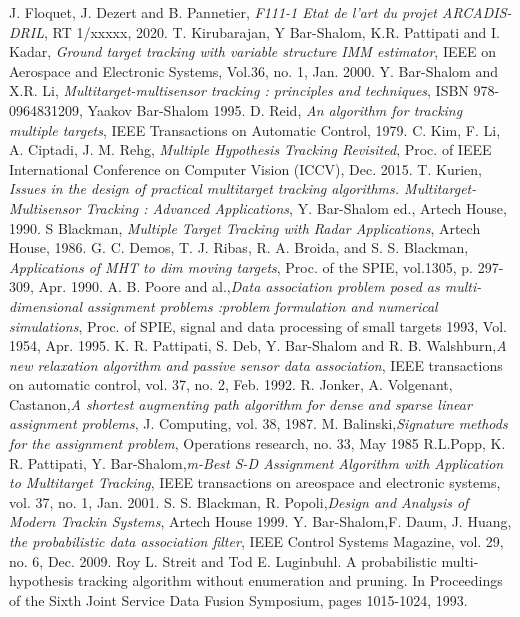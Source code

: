 \documentclass[10pt,french,a4paper]{report}
\begin{document}
 
 
  
 \begin{thebibliography}{9} 
 J. Floquet, J. Dezert and B. Pannetier, \emph{F111-1 Etat de l'art du projet ARCADIS-DRIL}, RT 1/xxxxx, 2020.
 T. Kirubarajan, Y Bar-Shalom, K.R. Pattipati and I. Kadar, \emph{Ground target tracking with
variable structure IMM estimator},
IEEE on Aerospace and Electronic Systems, Vol.36, no. 1, Jan. 2000.
 Y. Bar-Shalom and X.R. Li, \emph{Multitarget-multisensor tracking : principles and techniques},  ISBN 978-0964831209,  Yaakov Bar-Shalom 1995.
 D. Reid, \emph{An algorithm for tracking multiple targets}, IEEE Transactions on Automatic Control, 1979. 
   C. Kim, F. Li, A. Ciptadi, J. M. Rehg, \emph{Multiple Hypothesis Tracking Revisited}, Proc. of IEEE International Conference on Computer Vision (ICCV), Dec. 2015.
   T. Kurien, \emph{Issues in the design of practical multitarget tracking algorithms. Multitarget-Multisensor Tracking : Advanced Applications}, Y. Bar-Shalom ed., Artech House, 1990.
    S Blackman, \emph{Multiple Target Tracking with Radar Applications}, Artech House, 1986.
  G. C. Demos, T. J. Ribas, R. A. Broida, and S. S. Blackman, \emph{Applications of MHT to dim moving targets}, Proc. of the SPIE, vol.1305, p. 297-309, Apr. 1990.
 A. B. Poore and al.,\emph{Data association problem posed as multi-dimensional assignment problems :problem formulation and numerical simulations}, Proc. of  SPIE, signal and data processing of small targets 1993, Vol. 1954, Apr.
1995.
 K. R. Pattipati, S. Deb, Y. Bar-Shalom and R. B. Walshburn,\emph{A new relaxation algorithm and passive sensor data association}, IEEE transactions on automatic control, vol. 37, no. 2, Feb. 1992.
R. Jonker, A. Volgenant, Castanon,\emph{A shortest augmenting path algorithm for dense and sparse linear assignment
problems}, J. Computing, vol. 38, 1987.
M. Balinski,\emph{Signature methods for the assignment problem}, Operations research, no. 33, May 1985
R.L.Popp, K. R. Pattipati, Y. Bar-Shalom,\emph{m-Best S-D Assignment Algorithm with Application to Multitarget Tracking}, IEEE transactions on areospace and electronic systems, vol. 37, no. 1, Jan. 2001. 
S. S. Blackman, R. Popoli,\emph{Design and Analysis of Modern Trackin Systems}, Artech House 1999. 
Y. Bar-Shalom,F. Daum, J. Huang, \emph{the probabilistic data association filter}, IEEE Control Systems Magazine, vol. 29, no. 6, Dec. 2009. 
Roy L. Streit and Tod E. Luginbuhl. A probabilistic multi-hypothesis tracking algorithm without enumeration and pruning. In Proceedings of the Sixth Joint Service Data Fusion Symposium, pages 1015-1024, 1993.


\end{thebibliography}
\end{document}

